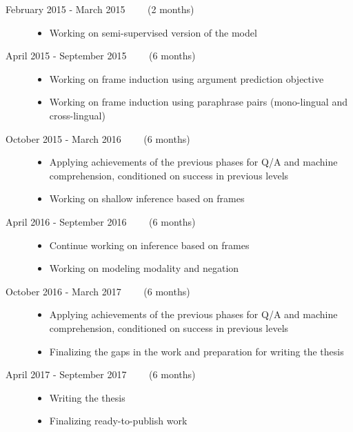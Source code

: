 \begin{description}
  \item[February 2015 - March 2015 ~~~~(2 months)]
  \hfill
  \begin{itemize}
    \item Working on semi-supervised version of the model
  \end{itemize}
  
  \item[April 2015 - September 2015  ~~~~(6 months)]\hfill 
  \begin{itemize}
    \item Working on frame induction using argument prediction objective
    \item Working on frame induction using paraphrase pairs (mono-lingual and
    cross-lingual)
  \end{itemize}
  
  
  \item[October 2015 - March 2016 ~~~~(6 months)]\hfill
	  \begin{itemize}
    	\item Applying achievements of the previous phases for Q/A and machine
    	comprehension, conditioned on success in previous levels
    	\item Working on shallow inference based on frames
	  \end{itemize}

  \item[April 2016 - September 2016 ~~~~(6 months)] \hfill 
	  \begin{itemize}
    	\item Continue working on inference based on frames
    	\item Working on modeling modality and negation
    
	  \end{itemize}

\item[October 2016 - March 2017 ~~~~(6 months)] \hfill
	  \begin{itemize}
    	\item Applying achievements of the previous phases for Q/A and machine
    	comprehension, conditioned on success in previous levels
    	\item Finalizing the gaps in the work and preparation for writing the
    	thesis
    
	  \end{itemize}

\item[April 2017 - September 2017 ~~~~(6 months)]\hfill
\begin{itemize}
    	\item Writing the thesis
    	\item Finalizing ready-to-publish work
    	    

\end{itemize}
\end{description}
